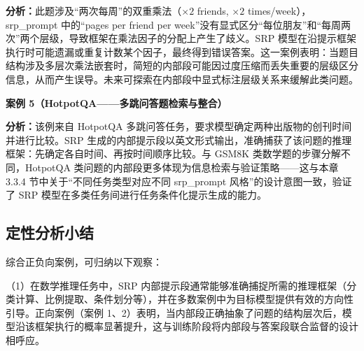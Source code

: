 \textbf{分析：}此题涉及“两次每周”的双重乘法（$\times 2$ friends, $\times 2$ times/week），srp\_prompt 中的“pages per friend per week”没有显式区分“每位朋友”和“每周两次”两个层级，导致框架在乘法因子的分配上产生了歧义。SRP 模型在沿提示框架执行时可能遗漏或重复计数某个因子，最终得到错误答案。这一案例表明：当题目结构涉及多层次乘法嵌套时，简短的内部段可能因过度压缩而丢失重要的层级区分信息，从而产生误导。未来可探索在内部段中显式标注层级关系来缓解此类问题。

\textbf{案例 5（HotpotQA——多跳问答题检索与整合）}

\begin{center}
\setlength{\fboxsep}{7pt}
\setlength{\fboxrule}{0.3pt}
\end{center}

\textbf{分析：}该例来自 HotpotQA 多跳问答任务，要求模型确定两种出版物的创刊时间并进行比较。SRP 生成的内部提示段以英文形式输出，准确捕获了该问题的推理框架：先确定各自时间、再按时间顺序比较。与 GSM8K 类数学题的步骤分解不同，HotpotQA 类问题的内部段更多体现为信息检索与验证策略——这与本章 3.3.4 节中关于“不同任务类型对应不同 srp\_prompt 风格”的设计意图一致，验证了 SRP 模型在多类任务间进行任务条件化提示生成的能力。

\subsection{定性分析小结}

综合正负向案例，可归纳以下观察：

（1）在数学推理任务中，SRP 内部提示段通常能够准确捕捉所需的推理框架（分类计算、比例提取、条件划分等），并在多数案例中为目标模型提供有效的方向性引导。正向案例（案例 1、2）表明，当内部段正确抽象了问题的结构层次后，模型沿该框架执行的概率显著提升，这与训练阶段将内部段与答案段联合监督的设计相呼应。

